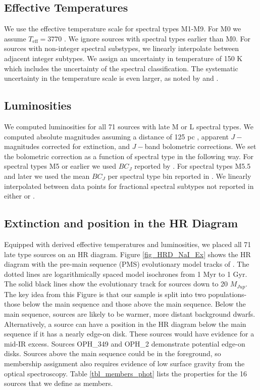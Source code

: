 \documentclass[12pt,preprint]{aastex}
\begin{document}
\subsection{Effective Temperatures}
We use the \cite{2003ApJ...593.1093L} effective temperature scale for spectral types M1-M9.  For M0 we assume $T_{\mathrm{eff}}= 3770$ \citep{2013ApJS..208....9P}.  We ignore sources with spectral types earlier than M0.  For sources with non-integer spectral substypes, we linearly interpolate between adjacent integer subtypes.  We assign an uncertainty in temperature of 150 K which includes the uncertainty of the spectral classification.  The systematic uncertainty in the temperature scale is even larger, as noted by \citet{2013ApJS..208....9P} and \citet{2010ApJS..186...63R}.

\subsection{Luminosities}
We computed luminosities for all 71 sources with late M or L spectral types.  We computed absolute magnitudes assuming a distance of 125 pc \citep{2008ApJ...675L..29L}, apparent $J-$ magnitudes corrected for extinction, and $J-$band bolometric corrections.  We set the bolometric correction as a function of spectral type in the following way.  For spectral types M5 or earlier we used $BC_J$ reported by \citep{2013ApJS..208....9P}.  For spectral types M5.5 and later we used the mean $BC_J$ per spectral type bin reported in \citet{2002AJ....124.1170D}.  We linearly interpolated between data points for fractional spectral subtypes not reported in either \citet{2002AJ....124.1170D} or \citet{2013ApJS..208....9P}.


\subsection{Extinction and position in the HR Diagram}
\label{sec_HRD}
Equipped with derived effective temperatures and luminosities, we placed all 71 late type sources on an HR diagram.  Figure \ref{fig_HRD_NaI_Ex} shows the HR diagram with the pre-main sequence (PMS) evolutionary model tracks of \citep{1998A&A...337..403B,2002A&A...382..563B}.  The dotted lines are logarithmically spaced model isochrones from 1 Myr to 1 Gyr.  The solid black lines show the evolutionary track for sources down to 20 $M_{Jup}$.  The key idea from this Figure is that our sample is split into two populations- those below the main sequence and those above the main sequence.  Below the main sequence, sources are likely to be warmer, more distant background dwarfs.  Alternatively, a source can have a position in the HR diagram below the main sequence if it has a nearly edge-on disk.  These sources would have evidence for a mid-IR excess.  Sources OPH\_349 and OPH\_2 demonstrate potential edge-on disks.  Sources above the main sequence could be in the foreground, so membership assignment also requires evidence of low surface gravity from the optical spectroscopy.  Table \ref{tbl_members_phot} lists the properties for the 16 sources that we define as members.
\end{document}
